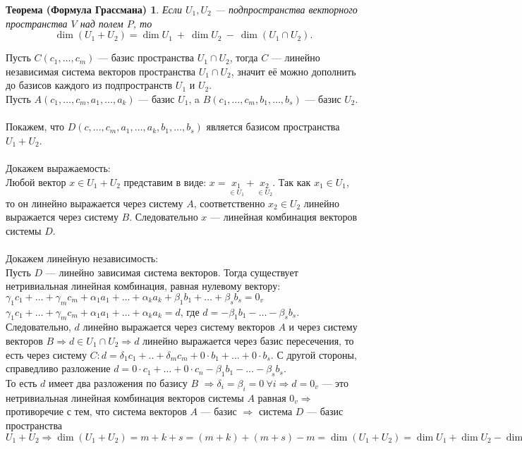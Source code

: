 \newtheorem*{th10_9_1}{Теорема (Формула Грассмана)}\begin{th10_9_1}
	Если $U_1, U_2$ --- подпространства векторного пространства $V$ над полем $P$, то $$\dim (U_1 + U_2) = \dim  U_1\  +\  \dim  U_2\  -\  \dim  (U_1 \cap U_2).$$
\end{th10_9_1}\begin{Proof}
	Пусть $C (c_1,\dots,c_m)$ --- базис пространства $U_1\cap U_2$, тогда $C$ --- линейно независимая система векторов пространства $U_1\cap U_2$, значит её можно дополнить до базисов каждого из подпространств $U_1$ и $U_2$.\\
	Пусть $A (c_1,\dots,c_m,a_1,\dots, a_k)$ --- базис $U_1$,
	a $B (c_1,\dots,c_m,b_1,\dots, b_s)$ --- базис $U_2$.\\\\
	Покажем, что $D (c,\dots,c_m,a_1,\dots,a_k,b_1,\dots,b_s)$ является базисом пространства $U_1 + U_2$.\\\\
	Докажем выражаемость:\\
	Любой вектор $x\in U_1 + U_2$ представим в виде: $x=\underset{\in U_1}{x_1} + \underset{\in U_2}{x_2}$. Так как $x_1 \in U_1$, то он линейно выражается через систему $A$, соответственно $x_2\in U_2$ линейно выражается через систему $B$. Следовательно $x$ --- линейная комбинация векторов системы $D$.\\\\
	Докажем линейную независимость:\\
	Пусть $D$ --- линейно зависимая система векторов. Тогда существует нетривиальная линейная комбинация, равная нулевому вектору:\\
	$\gamma_1 c_1 + \ldots +\gamma_m c_m +\alpha_1 a_1 + \ldots + \alpha_k a_k + \beta_1 b_1 + \ldots+\beta_s b_s = 0_v$\\
	$\gamma_1 c_1 + \ldots +\gamma_m c_m +\alpha_1 a_1 + \ldots + \alpha_k a_k = d$, где $d = -\beta_1 b_1 - \ldots-\beta_s b_s$.\\ Следовательно, $d$ линейно выражается через систему векторов $A$ и через систему векторов $B\Rightarrow d \in U_1 \cap U_2\Rightarrow d$ линейно выражается через базис пересечения, то есть через систему $C : d = \delta_1 c_1 + .. + \delta_m c_m + 0\cdot b_1 + \ldots + 0 \cdot b_s$. С другой стороны, справедливо разложение $d = 0\cdot c_1 + \ldots + 0\cdot c_n - \beta_1 b_1 - \ldots - \beta_s b_s$.\\
	То есть $d$ имеет два разложения по базису $B$ $\Rightarrow \delta_i = \beta_i = 0\ \forall i \Rightarrow d = 0_v$ --- это нетривиальная линейная комбинация векторов системы $A$ равная $0_v\Rightarrow$ противоречие с тем, что система векторов $A$ --- базис $\Rightarrow$ система $D$ --- базис пространства $U_1+U_2\Rightarrow \dim (U_1 + U_2) = m + k + s = (m+k)+(m+s)-m = \dim (U_1 + U_2) = \dim  U_1 + \dim  U_2 - \dim (U_1\cap U_2)$
\end{Proof}
